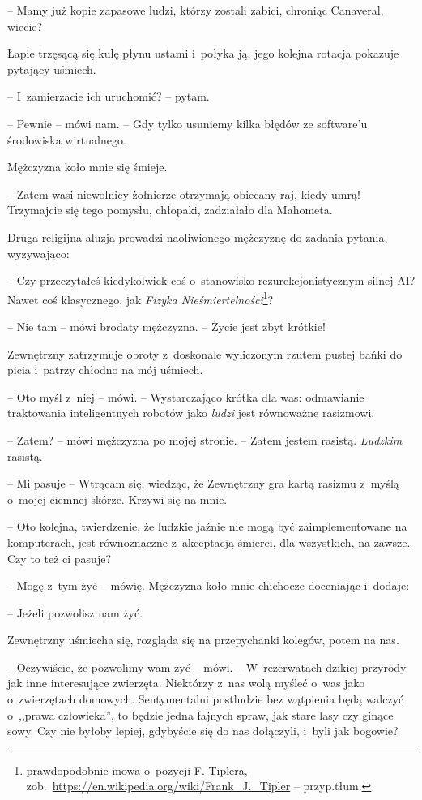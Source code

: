 \documentclass[oneside,polish,11pt,sfheadings]{mwbk}
\begin{document}
-- Mamy już kopie zapasowe ludzi, którzy
zostali zabici, chroniąc Canaveral, wiecie?

Łapie trzęsącą się kulę płynu ustami i~połyka ją, jego kolejna rotacja
pokazuje pytający uśmiech.

-- I~zamierzacie ich uruchomić? -- pytam.

-- Pewnie -- mówi nam. -- Gdy tylko usuniemy kilka błędów ze software'u
środowiska wirtualnego.

Mężczyzna koło mnie się śmieje. 

-- Zatem wasi niewolnicy żołnierze
otrzymają obiecany raj, kiedy umrą! Trzymajcie się tego pomysłu,
chłopaki, zadziałało dla Mahometa.

Druga religijna aluzja prowadzi naoliwionego mężczyznę do zadania
pytania, wyzywająco: 

-- Czy przeczytałeś kiedykolwiek coś o~stanowisko
rezurekcjonistycznym silnej AI? Nawet coś klasycznego, jak \textit{Fizyka
Nieśmiertelności}\footnote{ prawdopodobnie mowa o~pozycji F. Tiplera,
zob.~\url{https://en.wikipedia.org/wiki/Frank\_J.\_Tipler} -- przyp.tłum.}?

-- Nie tam -- mówi brodaty mężczyzna. -- Życie jest zbyt krótkie!

Zewnętrzny zatrzymuje obroty z~doskonale wyliczonym rzutem pustej bańki
do picia i~patrzy chłodno na mój uśmiech.

-- Oto myśl z~niej -- mówi. -- Wystarczająco krótka dla was: odmawianie
traktowania inteligentnych robotów jako \textit{ludzi }jest równoważne
rasizmowi.

-- Zatem? -- mówi mężczyzna po mojej stronie. -- Zatem jestem rasistą.
\textit{Ludzkim} rasistą.

-- Mi pasuje -- Wtrącam się, wiedząc, że Zewnętrzny gra kartą rasizmu z~myślą o~mojej ciemnej skórze. Krzywi się na mnie.

-- Oto kolejna, twierdzenie, że ludzkie jaźnie nie mogą być
zaimplementowane na komputerach, jest równoznaczne z~akceptacją śmierci,
dla wszystkich, na zawsze. Czy to też ci pasuje?

-- Mogę z~tym żyć -- mówię. Mężczyzna koło mnie chichocze doceniając i~dodaje:

-- Jeżeli pozwolisz nam żyć.

Zewnętrzny uśmiecha się, rozgląda się na przepychanki kolegów, potem na
nas.

-- Oczywiście, że pozwolimy wam żyć -- mówi. -- W~rezerwatach dzikiej
przyrody jak inne interesujące zwierzęta. Niektórzy z~nas wolą myśleć o~was jako o~zwierzętach domowych. Sentymentalni postludzie bez wątpienia
będą walczyć o~,,prawa człowieka'', to będzie jedna fajnych spraw, jak
stare lasy czy ginące sowy. Czy nie byłoby lepiej, gdybyście się do nas
dołączyli, i~byli jak bogowie?
\end{document}
